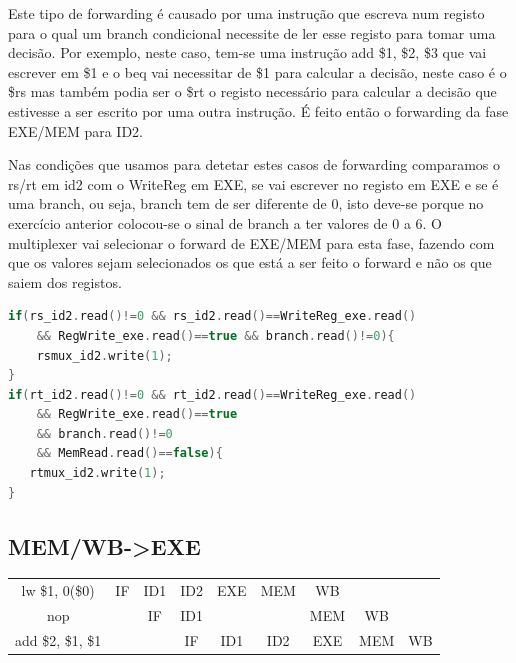\documentclass[pdftex,12pt,a4paper]{report}
\begin{document}
Este tipo de forwarding é causado por uma instrução que escreva num registo para o qual um branch condicional necessite de ler esse registo para tomar uma decisão. Por exemplo, neste caso, tem-se uma instrução add \$1, \$2, \$3 que vai escrever em \$1 e o beq vai necessitar de \$1 para calcular a decisão, neste caso é o \$rs mas também podia ser o \$rt o registo necessário para calcular a decisão que estivesse a ser escrito por uma outra instrução. É feito então o forwarding da fase EXE/MEM para ID2.

Nas condições que usamos para detetar estes casos de forwarding comparamos o rs/rt em id2 com o WriteReg em EXE, se vai escrever no registo em EXE e se é uma branch, ou seja, branch tem de ser diferente de 0, isto deve-se porque no exercício anterior colocou-se o sinal de branch a ter valores de 0 a 6. O multiplexer vai selecionar o forward de EXE/MEM para esta fase, fazendo com que os valores sejam selecionados os que está a ser feito o forward e não os que saiem dos registos.
\newpage

\begin{lstlisting}[language=c]
if(rs_id2.read()!=0 && rs_id2.read()==WriteReg_exe.read() 
	&& RegWrite_exe.read()==true && branch.read()!=0){
    rsmux_id2.write(1);
}
if(rt_id2.read()!=0 && rt_id2.read()==WriteReg_exe.read() 
	&& RegWrite_exe.read()==true 
	&& branch.read()!=0 
	&& MemRead.read()==false){
   rtmux_id2.write(1);
}
\end{lstlisting} 


\subsection{MEM/WB->EXE}

\begin{table}[!htb]
\centering
\label{my-label}
\begin{tabular}{ccc|c|c|c|c|cc}
\cline{2-7}
\multicolumn{1}{c|}{lw \$1, 0(\$0)} & \multicolumn{1}{c|}{IF} & ID1 & ID2 & EXE                                                & \cellcolor[HTML]{F8A102}MEM                        & \cellcolor[HTML]{FFCC67}WB  &                          &                         \\ \cline{2-8}
nop                               & \multicolumn{1}{c|}{}   & IF  & ID1 & \cellcolor[HTML]{FFFFFF}{\color[HTML]{000000} ID2} & \cellcolor[HTML]{FFFFFF}{\color[HTML]{333333} EXE} & MEM                         & \multicolumn{1}{c|}{WB}  &                         \\ \cline{3-9} 
add \$2, \$1, \$1                   &                         &     & IF  & ID1                                                & ID2                                                & \cellcolor[HTML]{F8A102}EXE & \multicolumn{1}{c|}{MEM} & \multicolumn{1}{c|}{WB} \\ \cline{4-9} 
\end{tabular}
\end{table}
\end{document}
